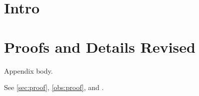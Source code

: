 \section{Intro}
\appendices
\section[Technical Proofs]{Proofs and Details Revised}\label{sec:proof}
\begin{oblemma}\label{obs:proof}
Appendix body.
\end{oblemma}
See \autoref{sec:proof}, \cref{obs:proof}, and .
